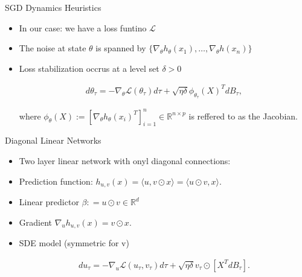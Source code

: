 \documentclass[fleqn]{beamer}
\begin{document}
    \begin{frame}{SGD Dynamics Heuristics}
        \begin{itemize}
            \item In our case: we have a loss funtino $\mathcal{L}$
            \item The noise at state $\theta$ is spanned by
                $\{\nabla_\theta h_\theta(x_1), \ldots, \nabla_\theta
                h(x_n)\} $
            \item Loss stabilization occrus at a level set $\delta > 0$
            \begin{center}
            \begin{minipage}{0.5\textwidth}
                \begin{align*}
                    d\theta_\tau = -\nabla_\theta \mathcal{L}(\theta_\tau)d\tau
                    + \sqrt{\eta\delta}
                    \phi_{\theta_\tau}\left(X\right)^{T}dB_\tau,
                \end{align*}
            \end{minipage}
            \end{center}
            \vspace{0.5cm}
            where $\phi_\theta(X) := [\nabla_\theta
            h_\theta(x_i)^{T}]_{i=1}^{n} \in \mathbb{R}^{n\times p}$ is
            reffered to as the Jacobian.
        \end{itemize}
    \end{frame}

    \begin{frame}{Diagonal Linear Networks}
        \begin{itemize}
            \item Two layer linear network with onyl diagonal connections:
            \item Prediction function:
                $h_{u, v}(x) = \langle u, v\odot x\rangle =  \langle u \odot
                v, x\rangle$.
            \item Linear predictor $\beta: = u \odot v \in \mathbb{R}^{d}$
            \item Gradient $\nabla_u h_{u, v}(x) = v \odot x$.
            \item SDE model (symmetric for v)
            \begin{center}
            \begin{minipage}{0.5\textwidth}
                \begin{align*}
                    du_\tau = -\nabla_u \mathcal{L}(u_\tau, v_\tau) d\tau
                    +\sqrt{\eta \delta} v_\tau \odot [X^{T}dB_\tau].
                \end{align*}
            \end{minipage}
            \end{center}

        \end{itemize}
    \end{frame}
\end{document}
